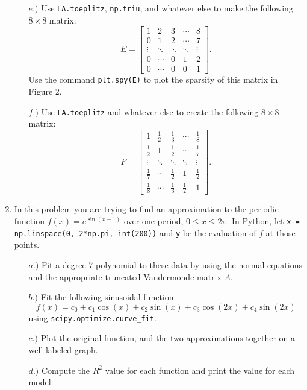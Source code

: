 \documentclass[10pt]{article}
\begin{document}
\begin{enumerate}[{$\qquad 1.]
\begin{enumerate}
\item[$e.)$] Use \texttt{LA.toeplitz}, \texttt{np.triu}, and whatever else to make the following $8\times 8$ matrix:
\[\displaystyle E = \begin{bmatrix} 1 & 2 & 3 & \cdots & 8  \\ 
0  & 1 & 2 & \cdots & 7 \\ 
\vdots & \ddots & \ddots & \ddots & \vdots \\
0 &  \cdots & 0 & 1 & 2 \\
0 &  \cdots & 0 & 0 & 1\end{bmatrix}.\]
Use the command \texttt{plt.spy(E)} to plot the sparsity of this matrix in Figure 2.
 
\item[$f.)$] Use \texttt{LA.toeplitz} and whatever else to create the following $8\times 8$ matrix:
\[\displaystyle F = \begin{bmatrix} 1 & \frac{1}{2} & \frac{1}{3} & \cdots & \frac{1}{8}  \\ 
\frac{1}{2}  & 1 & \frac{1}{2} & \cdots & \frac{1}{7} \\ 
\vdots & \ddots & \ddots & \ddots & \vdots \\
\frac{1}{7} &  \cdots & \frac{1}{2} & 1 & \frac{1}{2} \\
\frac{1}{8} &  \cdots & \frac{1}{3} & \frac{1}{2} & 1\end{bmatrix}.\]

\end{enumerate}


\item In this problem you are trying to find an approximation to the periodic function $f(x) = e^{\sin(x-1)}$ over one period, $0\leq x \leq 2\pi$.  In Python, let \verb|x = np.linspace(0, 2*np.pi, int(200))| and \texttt{y} be the evaluation of $f$ at those points.
\begin{enumerate}
	\item[$a.)$] Fit a degree 7 polynomial to these data by using the normal equations and the appropriate truncated Vandermonde matrix $A$. 
	\item[$b.)$] Fit the following sinusoidal function 
		\[ f(x) = c_0 + c_1 \cos(x) + c_2 \sin(x) + c_3\cos(2x) + c_4\sin(2x) \]
		using \verb|scipy.optimize.curve_fit|.  
	\item[$c.)$] Plot the original function, and the two approximations together on a well-labeled graph. 
	\item[$d.)$] Compute the $R^2$ value for each function and print the value for each model.
	

\end{enumerate}
\end{enumerate}
\end{document}
